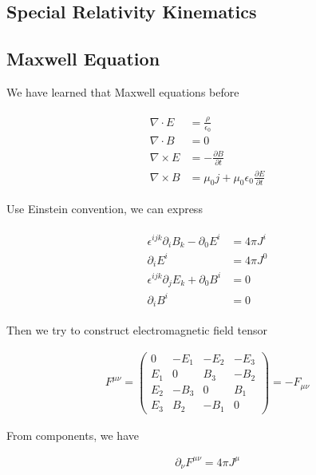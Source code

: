 \subsection{Special Relativity Kinematics}

\subsection{Maxwell Equation}

We have learned that Maxwell equations before

\begin{align}
    \begin{aligned}
        \nabla \cdot E &=\frac{\rho}{\epsilon_{0}}\\
        \nabla\cdot B&=0\\
        \nabla \times E&=-\frac{\partial B}{\partial t}\\
        \nabla \times B&=\mu_{0}j+\mu_{0}\epsilon_{0}\frac{\partial E}{\partial t}
    \end{aligned}
\end{align}

Use Einstein convention, we can express

\begin{align}
    \begin{aligned}
        \epsilon^{ijk}\partial_{i}B_{k}-\partial_{0}E^{i}&=4\pi J^{i}\\
        \partial_{i}E^{i}&=4\pi J^{0}\\
        \epsilon^{ijk}\partial_{j}E_{k}+\partial_{0}B^{i}&=0\\
        \partial_{i}B^{i}&=0
    \end{aligned}
\end{align}

Then we try to construct electromagnetic field tensor

\begin{align}
    F^{\mu\nu}=\begin{pmatrix}
    0 & -E_{1} &-E_{2}  &-E_{3} \\
    E_{1} & 0 & B_{3} & -B_{2}\\
    E_{2} & -B_{3} &  0& B_{1}\\
    E_{3} & B_{2} & -B_{1} &0 
    \end{pmatrix}=-F_{\mu\nu}
\end{align}

From components, we have 

\begin{align}
    \partial_{\nu}F^{\mu\nu}=4\pi J^{\mu}
\end{align}